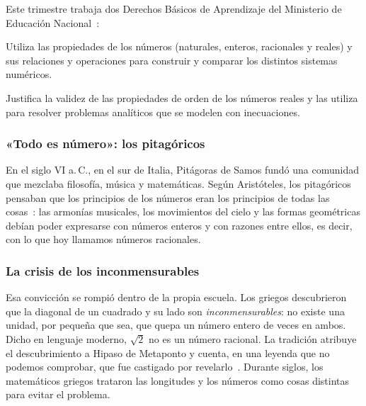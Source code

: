 \documentclass[11pt]{article}
\begin{document}
Este trimestre trabaja dos Derechos Básicos de Aprendizaje del Ministerio de
Educación Nacional~\cite{mendba}:

\begin{dba}
Utiliza las propiedades de los números (naturales, enteros, racionales y reales) y
sus relaciones y operaciones para construir y comparar los distintos sistemas
numéricos.
\end{dba}

\begin{dba}
Justifica la validez de las propiedades de orden de los números reales y las
utiliza para resolver problemas analíticos que se modelen con inecuaciones.
\end{dba}


\subsubsection*{«Todo es número»: los pitagóricos}

En el siglo VI a.\,C., en el sur de Italia, Pitágoras de Samos fundó una comunidad
que mezclaba filosofía, música y matemáticas. Según Aristóteles, los pitagóricos
pensaban que los principios de los números eran los principios de todas las
cosas~\cite{aristoteles}: las armonías musicales, los movimientos del cielo y las
formas geométricas debían poder expresarse con números enteros y con razones
entre ellos, es decir, con lo que hoy llamamos números racionales.

\subsubsection*{La crisis de los inconmensurables}

Esa convicción se rompió dentro de la propia escuela. Los griegos descubrieron que
la diagonal de un cuadrado y su lado son \emph{inconmensurables}: no existe una
unidad, por pequeña que sea, que quepa un número entero de veces en ambos. Dicho
en lenguaje moderno, $\sqrt{2}$ no es un número racional. La tradición atribuye el
descubrimiento a Hipaso de Metaponto y cuenta, en una leyenda que no podemos
comprobar, que fue castigado por revelarlo~\cite{kline}. Durante siglos, los
matemáticos griegos trataron las longitudes y los números como cosas distintas
para evitar el problema.
\end{document}
